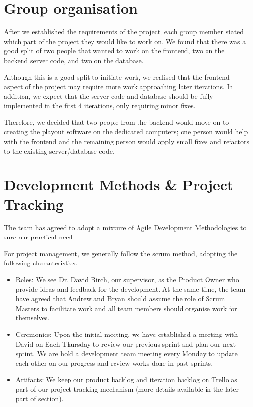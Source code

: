 \documentclass[a4paper]{article}
\begin{document}
\section{Group organisation} \label{sec:group}
After we established the requirements of the project, each group member stated
which part of the project they would like to work on. We found that there was a
good split of two people that wanted to work on the frontend, two on the backend
server code, and two on the database.

Although this is a good split to initiate work, we realised that the frontend 
aspect of the project may require more work approaching later iterations.
In addition, we  expect that the server code and database should be fully 
implemented in the first 4 iterations, only requiring minor fixes.

Therefore, we decided that two people from the backend would move on to creating
the playout software on the dedicated computers; one person would help with the
frontend and the remaining person would apply small fixes and refactors to the
existing server/database code. 


\section{Development Methods \& Project Tracking}
The team has agreed to adopt a mixture of Agile Development Methodologies to
sure our practical need.

For project management, we generally follow the scrum method, adopting the
following characteristics:
\begin{itemize}
  \item Roles: We see Dr. David Birch, our supervisor, as the Product Owner
        who provide ideas and feedback for the development. At the same time,
        the team have agreed that Andrew and Bryan should assume the role of
        Scrum Masters to facilitate work and all team members should organise
        work for themselves.
  \item Ceremonies: Upon the initial meeting, we have established a
        meeting with David on Each Thursday to review our previous sprint 
        and plan our next sprint. We are hold a development team
        meeting every Monday to update each other on our progress and
        review works done in past sprints.
  \item Artifacts: We keep our product backlog and iteration backlog on
        Trello as part of our project tracking mechanism (more details
        available in the later part of section).
\end{itemize}
\end{document}
